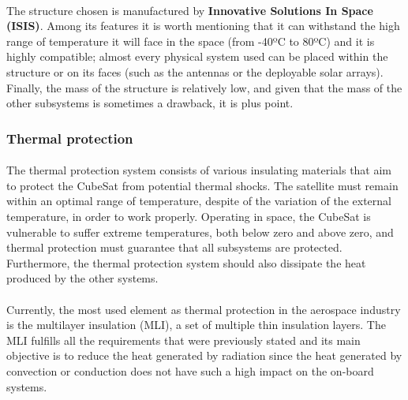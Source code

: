 \paragraph{}The structure chosen is manufactured by \textbf{Innovative Solutions In Space (ISIS)}. Among its features it is worth mentioning that it can withstand the high range of temperature it will face in the space (from -40ºC to 80ºC) and it is highly compatible; almost every physical system  used can be placed within the structure or on its faces (such as the antennas or the deployable solar arrays). Finally, the mass of the structure is relatively low, and given that the mass of the other subsystems is sometimes a drawback, it is plus point.
%

\subsubsection{Thermal protection}
\paragraph{}The thermal protection system consists of various insulating materials that aim to protect the CubeSat from potential thermal shocks. The satellite must remain within an optimal range of temperature, despite of the variation of the external temperature, in order to work properly. Operating in space, the CubeSat is vulnerable to suffer extreme temperatures, both below zero and above zero, and thermal protection must guarantee that all subsystems are protected. Furthermore, the thermal protection system should also dissipate the heat produced by the other systems.

\paragraph{} Currently, the most used element as thermal protection in the aerospace industry is the multilayer insulation (MLI), a set of multiple thin insulation layers. The MLI fulfills all the requirements that were previously stated and its main objective is to reduce the heat generated by radiation since the heat generated by convection or conduction does not have such a high impact on the on-board systems.

